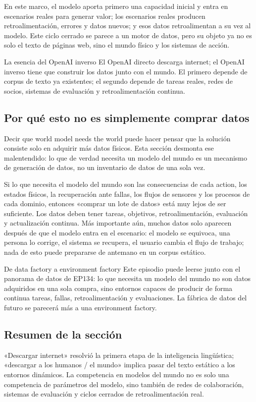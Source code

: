 En este marco, el modelo aporta primero una capacidad inicial y entra en escenarios reales para generar valor; los escenarios reales producen retroalimentación, errores y datos nuevos; y esos datos retroalimentan a su vez al modelo. Este ciclo cerrado se parece a un motor de datos, pero su objeto ya no es solo el texto de páginas web, sino el mundo físico y los sistemas de acción.

\begin{importantbox}{La esencia del OpenAI inverso}
El OpenAI directo descarga internet; el OpenAI inverso tiene que construir los datos junto con el mundo. El primero depende de corpus de texto ya existentes; el segundo depende de tareas reales, redes de socios, sistemas de evaluación y retroalimentación continua.
\end{importantbox}

\subsection{Por qué esto no es simplemente comprar datos}

Decir que world model needs the world puede hacer pensar que la solución consiste solo en adquirir más datos físicos. Esta sección desmonta ese malentendido: lo que de verdad necesita un modelo del mundo es un mecanismo de generación de datos, no un inventario de datos de una sola vez.

Si lo que necesita el modelo del mundo son las consecuencias de cada action, los estados físicos, la recuperación ante fallas, los flujos de sensores y los procesos de cada dominio, entonces «comprar un lote de datos» está muy lejos de ser suficiente. Los datos deben tener tareas, objetivos, retroalimentación, evaluación y actualización continua. Más importante aún, muchos datos solo aparecen después de que el modelo entra en el escenario: el modelo se equivoca, una persona lo corrige, el sistema se recupera, el usuario cambia el flujo de trabajo; nada de esto puede prepararse de antemano en un corpus estático.

\begin{knowledgebox}{De data factory a environment factory}
Este episodio puede leerse junto con el panorama de datos de EP134: lo que necesita un modelo del mundo no son datos adquiridos en una sola compra, sino entornos capaces de producir de forma continua tareas, fallas, retroalimentación y evaluaciones. La fábrica de datos del futuro se parecerá más a una environment factory.
\end{knowledgebox}

\subsection{Resumen de la sección}

«Descargar internet» resolvió la primera etapa de la inteligencia lingüística; «descargar a los humanos / el mundo» implica pasar del texto estático a los entornos dinámicos. La competencia en modelos del mundo no es solo una competencia de parámetros del modelo, sino también de redes de colaboración, sistemas de evaluación y ciclos cerrados de retroalimentación real.
